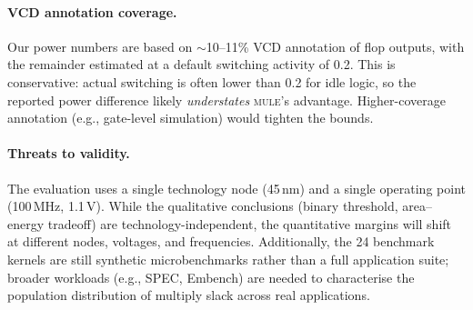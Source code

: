 \paragraph{VCD annotation coverage.}
Our power numbers are based on $\sim$10--11\% VCD annotation of flop
outputs, with the remainder estimated at a default switching activity
of 0.2. This is conservative: actual switching is often lower than 0.2
for idle logic, so the reported power difference likely
\emph{understates} \textsc{mule}'s advantage. Higher-coverage
annotation (e.g., gate-level simulation) would tighten the bounds.

\paragraph{Threats to validity.}
The evaluation uses a single technology node (45\,nm) and a single
operating point (100\,MHz, 1.1\,V). While the qualitative conclusions
(binary threshold, area--energy tradeoff) are technology-independent,
the quantitative margins will shift at different nodes, voltages, and
frequencies. Additionally, the 24 benchmark kernels are still synthetic
microbenchmarks rather than a full application suite; broader workloads
(e.g., SPEC, Embench) are needed to characterise the population
distribution of multiply slack across real applications.